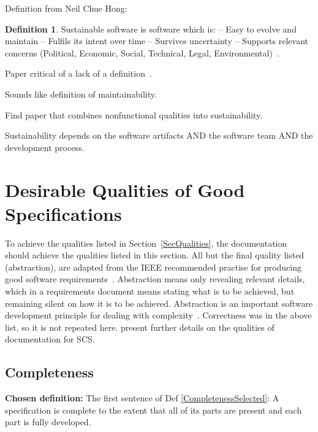 \documentclass[letterpaper,cleveref]{lipics-v2019}
\theoremstyle{definition}
\newtheorem{defn}{Definition}
\begin{document}
Definition from Neil Chue Hong:
\begin{defn}
Sustainable software is software which is:
-- Easy to evolve and maintain
-- Fulfils its intent over time
-- Survives uncertainty
-- Supports relevant concerns (Political, Economic, Social, Technical,
Legal, Environmental)~\cite{Katz2016}.
\end{defn}

Paper critical of a lack of a definition~\cite{VentersEtAl2014}.

Sounds like definition of maintainability.

Find paper that combines nonfunctional qualities into sustainability.

Sustainability depends on the software artifacts AND the software team AND the
development process.

\section{Desirable Qualities of Good Specifications} \label{SecDesirableQs}

To achieve the qualities listed in Section~\ref{SecQualities}, the documentation
should achieve the qualities listed in this section.  All but the final quality
listed (abstraction), are adapted from the IEEE recommended practise for
producing good software requirements~\cite{IEEE1998}.  Abstraction means only
revealing relevant details, which in a requirements document means stating what
is to be achieved, but remaining silent on how it is to be achieved.
Abstraction is an important software development principle for dealing with
complexity~\cite[p.~40]{GhezziEtAl2003}.  Correctness was in the above list, so
it is not repeated here.  \citet{SmithAndKoothoor2016} present further details
on the qualities of documentation for SCS.

\subsection{Completeness}
\noindent \textbf{Chosen definition:} The first sentence of Def
\ref{CompletenessSelected}: A specification is complete to the extent that all
of its parts are present and each part is fully developed.
\end{document}
